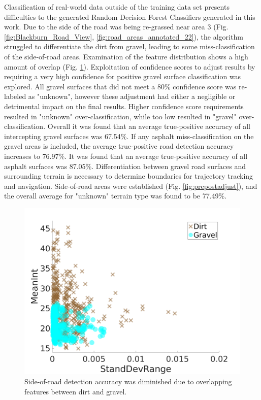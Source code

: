 \documentclass[journal,onecolumn]{IEEEtran}
\begin{document}
		{Classification of real-world data outside of the training data set presents difficulties to the generated Random Decision Forest Classifiers generated in this work. Due to the side of the road was being re-grassed near area $3$ (Fig. \ref{fig:Blackburn_Road_View}, \ref{fig:road_areas_annotated_22}), the algorithm struggled to differentiate the dirt from gravel, leading to some miss-classification of the side-of-road areas. Examination of the feature distribution shows a high amount of overlap (Fig. \ref{fig:dirt_v_gravel}). Exploitation of confidence scores to adjust results by requiring a very high confidence for positive gravel surface classification was explored. All gravel surfaces that did not meet a 80\% confidence score was re-labeled as "unknown", however these adjustment had either a negligible or detrimental impact on the final results. Higher confidence score requirements resulted in "unknown" over-classification, while too low resulted in "gravel" over-classification. Overall it was found that an average true-positive accuracy of all intercepting gravel surfaces was 67.54\%. If any asphalt miss-classification on the gravel areas is included, the average true-positive road detection accuracy increases to 76.97\%. It was found that an average true-positive accuracy of all asphalt surfaces was 87.05\%. Differentiation between gravel road surfaces and surrounding terrain is necessary to determine boundaries for trajectory tracking and navigation. Side-of-road areas were established (Fig. \ref{fig:prepostadjust}), and the overall average for "unknown" terrain type was found to be 77.49\%.}
		
		\begin{figure}[H]
			\centering
			\includegraphics[width=0.75\linewidth]{figures/dirt_v_gravel2}
			\caption[Re-grassed Dirt vs Gravel]{Side-of-road detection accuracy was diminished due to overlapping features between dirt and gravel. }
			\label{fig:dirt_v_gravel}
		\end{figure}
	
\end{document}
